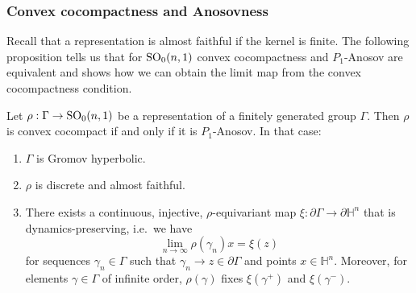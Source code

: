 \documentclass{report}
\begin{document}
\subsubsection{Convex cocompactness and Anosovness}
Recall that a representation is almost faithful if the kernel is finite.
The following proposition tells us that for $\operatorname{{\mathrm{SO}}}_0(n,1)$ convex cocompactness and $P_1$-Anosov are equivalent and shows how we can obtain the limit map from the convex cocompactness condition.
\begin{theorem}\label{thm:convex_cocompact_anosov}
    Let $\rho: \Gamma \to \operatorname{{\mathrm{SO}}}_0(n,1)$ be a representation of a finitely generated group $\Gamma$.
    Then $\rho$ is convex cocompact if and only if it is $P_1$-Anosov.
    In that case:
    \begin{enumerate}[label=(\roman*)]
        \item $\Gamma$ is Gromov hyperbolic.
        \item $\rho$ is discrete and almost faithful.
        \item There exists a continuous, injective, $\rho$-equivariant map $\xi: \partial \Gamma \to \partial \mathbb H^n$ that is dynamics-preserving, i.e.\ we have 
        $$\lim_{n \to \infty} \rho(\gamma_n) x = \xi(z)$$
        for sequences $\gamma_n \in \Gamma$ such that $\gamma_n \to z \in \partial \Gamma$ and points $x \in \mathbb H^n$.
        Moreover, for elements $\gamma \in \Gamma$ of infinite order, $\rho(\gamma)$ fixes $\xi(\gamma^+)$ and $\xi(\gamma^-)$.
    \end{enumerate}
\end{theorem}
\end{document}
